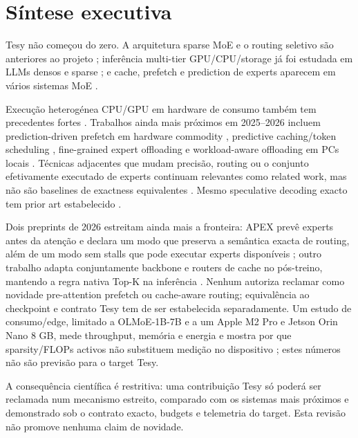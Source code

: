 \section{Síntese executiva}
Tesy não começou do zero. A arquitetura sparse MoE e o routing seletivo são anteriores ao projeto \cite{shazeer2017moe,fedus2022switch}; inferência multi-tier GPU/CPU/storage já foi estudada em LLMs densos e sparse \cite{sheng2023flexgen,alizadeh2024llmflash,eliseev2023offloading,yi2023edgemoe}; e cache, prefetch e prediction de experts aparecem em vários sistemas MoE \cite{xue2024moeinfinity,hwang2024pregated,song2024promoe,kong2026specprefetch}.

Execução heterogénea CPU/GPU em hardware de consumo também tem precedentes fortes \cite{song2024powerinfer,kamahori2025fiddler,chen2025ktransformers,wang2026localslo}. Trabalhos ainda mais próximos em 2025--2026 incluem prediction-driven prefetch em hardware commodity \cite{yu2025prescope}, predictive caching/token scheduling \cite{he2026expertflow}, fine-grained expert offloading \cite{yu2026finemoe} e workload-aware offloading em PCs locais \cite{zhu2026dali}. Técnicas adjacentes que mudam precisão, routing ou o conjunto efetivamente executado de experts continuam relevantes como related work, mas não são baselines de exactness equivalentes \cite{du2024sida,kong2024swapmoe,tang2024hobbit,zhong2024adapmoe}. Mesmo speculative decoding exacto tem prior art estabelecido \cite{leviathan2023speculative}.

Dois preprints de 2026 estreitam ainda mais a fronteira: APEX prevê experts antes da atenção e declara um modo que preserva a semântica exacta de routing, além de um modo sem stalls que pode executar experts disponíveis \cite{kanani2026apex}; outro trabalho adapta conjuntamente backbone e routers de cache no pós-treino, mantendo a regra nativa Top-K na inferência \cite{wu2026cacheaware}. Nenhum autoriza reclamar como novidade pre-attention prefetch ou cache-aware routing; equivalência ao checkpoint e contrato Tesy tem de ser estabelecida separadamente. Um estudo de consumo/edge, limitado a OLMoE-1B-7B e a um Apple M2 Pro e Jetson Orin Nano 8 GB, mede throughput, memória e energia e mostra por que sparsity/FLOPs activos não substituem medição no dispositivo \cite{alfarizy2026consumer}; estes números não são previsão para o target Tesy.

A consequência científica é restritiva: uma contribuição Tesy só poderá ser reclamada num mecanismo estreito, comparado com os sistemas mais próximos e demonstrado sob o contrato exacto, budgets e telemetria do target. Esta revisão não promove nenhuma claim de novidade.

